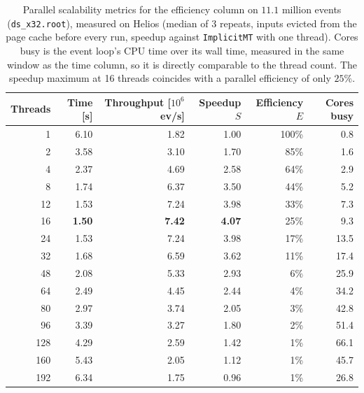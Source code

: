 \begin{table}[htbp]
\centering
\caption{Parallel scalability metrics for the efficiency column on $11.1$ million events (\texttt{ds\_x32.root}), measured on Helios (median of 3 repeats, inputs evicted from the page cache before every run, speedup against \texttt{ImplicitMT} with one thread). Cores busy is the event loop's CPU time over its wall time, measured in the same window as the time column, so it is directly comparable to the thread count. The speedup maximum at 16 threads coincides with a parallel efficiency of only $25\%$.}
\label{tab:scalability-efficiency}
\begin{tabular}{rrrrrr}
\toprule
Threads & Time [s] & Throughput [$10^6$ ev/s] & Speedup $S$ & Efficiency $E$ & Cores busy \\
\midrule
 1 & 6.10 & 1.82 & 1.00 & 100\% & 0.8 \\
 2 & 3.58 & 3.10 & 1.70 & 85\% & 1.6 \\
 4 & 2.37 & 4.69 & 2.58 & 64\% & 2.9 \\
 8 & 1.74 & 6.37 & 3.50 & 44\% & 5.2 \\
12 & 1.53 & 7.24 & 3.98 & 33\% & 7.3 \\
16 & \textbf{1.50} & \textbf{7.42} & \textbf{4.07} & 25\% & 9.3 \\
24 & 1.53 & 7.24 & 3.98 & 17\% & 13.5 \\
32 & 1.68 & 6.59 & 3.62 & 11\% & 17.4 \\
48 & 2.08 & 5.33 & 2.93 & 6\% & 25.9 \\
64 & 2.49 & 4.45 & 2.44 & 4\% & 34.2 \\
80 & 2.97 & 3.74 & 2.05 & 3\% & 42.8 \\
96 & 3.39 & 3.27 & 1.80 & 2\% & 51.4 \\
128 & 4.29 & 2.59 & 1.42 & 1\% & 66.1 \\
160 & 5.43 & 2.05 & 1.12 & 1\% & 45.7 \\
192 & 6.34 & 1.75 & 0.96 & 1\% & 26.8 \\
\bottomrule
\end{tabular}
\end{table}
